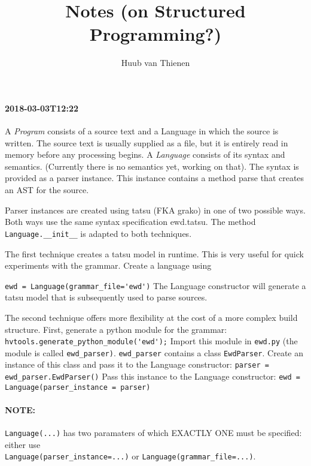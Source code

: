 \documentclass[11pt, a4paper]{article}
\begin{document}
\title{Notes (on Structured Programming?)}
\author{Huub van Thienen}
\maketitle

\paragraph{2018-03-03T12:22}

A \emph{Program} consists of a source text and a Language in which the source is written. 
The source text is usually supplied as a file, but it is entirely read in memory before any processing begins.
A \emph{Language} consists of its syntax and semantics. (Currently there is no semantics yet, working on that). 
The syntax is provided as a parser instance.
This instance contains a method parse that creates an AST for the source.

Parser instances are created using tatsu (FKA grako) in one of two possible ways. 
Both ways use the same syntax specification ewd.tatsu. 
The method \verb|Language.__init__| is adapted to both techniques.

The first technique creates a tatsu model in runtime. 
This is very useful for quick experiments with the grammar. 
Create a language using

\verb|ewd = Language(grammar_file='ewd')|
The Language constructor will generate a tatsu model that is subsequently used to parse sources.

The second technique offers more flexibility at the cost of a more complex build structure.
First, generate a python module for the grammar:\\
\verb|hvtools.generate_python_module('ewd');|
Import this module in \verb|ewd.py| (the module is called \verb|ewd_parser)|. 
\verb|ewd_parser| contains a class \verb|EwdParser|. 
Create an instance of this class and pass it to the Language constructor:
\verb|parser = ewd_parser.EwdParser()|
Pass this instance to the Language constructor:
\verb|ewd = Language(parser_instance = parser)|

\paragraph{NOTE:} \verb|Language(...)| has two paramaters of which EXACTLY ONE must be specified: either use\\
\verb|Language(parser_instance=...)| or \verb|Language(grammar_file=...)|.
\end{document}
